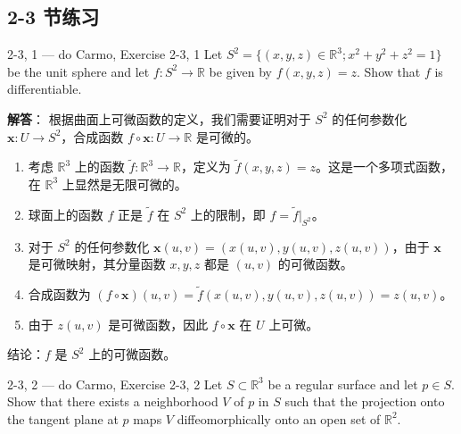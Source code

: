 \subsection*{2-3 节练习}

\begin{exercise}{2-3, 1 — do Carmo, Exercise 2-3, 1}
Let $S^2 = \{(x,y,z) \in \mathbb{R}^3; x^2 + y^2 + z^2 = 1\}$ be the unit sphere and let $f: S^2 \to \mathbb{R}$ be given by $f(x,y,z) = z$. Show that $f$ is differentiable.
\end{exercise}

\begin{solution}
\textbf{解答}：
根据曲面上可微函数的定义，我们需要证明对于 $S^2$ 的任何参数化 $\mathbf{x}: U \to S^2$，合成函数 $f \circ \mathbf{x}: U \to \mathbb{R}$ 是可微的。

\begin{enumerate}
    \item 考虑 $\mathbb{R}^3$ 上的函数 $\tilde{f}: \mathbb{R}^3 \to \mathbb{R}$，定义为 $\tilde{f}(x, y, z) = z$。这是一个多项式函数，在 $\mathbb{R}^3$ 上显然是无限可微的。
    \item 球面上的函数 $f$ 正是 $\tilde{f}$ 在 $S^2$ 上的限制，即 $f = \tilde{f}|_{S^2}$。
    \item 对于 $S^2$ 的任何参数化 $\mathbf{x}(u, v) = (x(u, v), y(u, v), z(u, v))$，由于 $\mathbf{x}$ 是可微映射，其分量函数 $x, y, z$ 都是 $(u, v)$ 的可微函数。
    \item 合成函数为 $(f \circ \mathbf{x})(u, v) = \tilde{f}(x(u, v), y(u, v), z(u, v)) = z(u, v)$。
    \item 由于 $z(u, v)$ 是可微函数，因此 $f \circ \mathbf{x}$ 在 $U$ 上可微。
\end{enumerate}
结论：$f$ 是 $S^2$ 上的可微函数。
\end{solution}

\begin{exercise}{2-3, 2 — do Carmo, Exercise 2-3, 2}
Let $S \subset \mathbb{R}^3$ be a regular surface and let $p \in S$. Show that there exists a neighborhood $V$ of $p$ in $S$ such that the projection onto the tangent plane at $p$ maps $V$ diffeomorphically onto an open set of $\mathbb{R}^2$.
\end{exercise}

